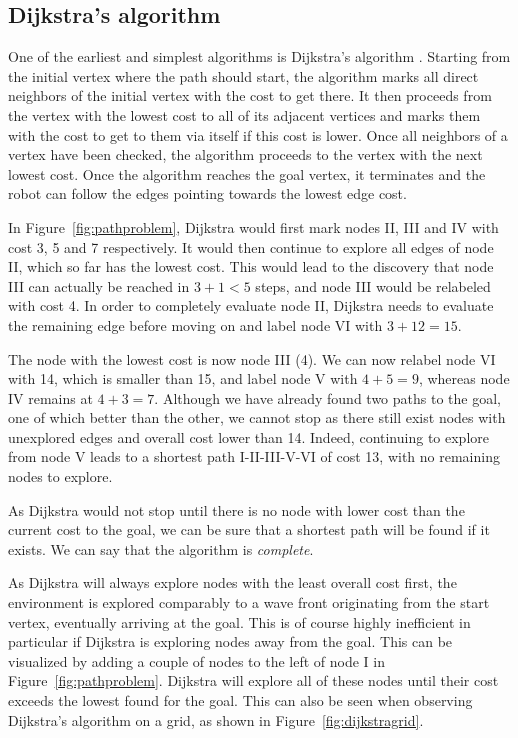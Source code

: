 \subsection{Dijkstra's algorithm}
One of the earliest and simplest algorithms is Dijkstra's algorithm \cite{dijkstra1959note}. Starting from the initial vertex where the path should start, the algorithm marks all direct neighbors of the initial vertex with the cost to get there. It then proceeds from the vertex with the lowest cost to all of its adjacent vertices and marks them with the cost to get to them via itself if this cost is lower. Once all neighbors of a vertex have been checked, the algorithm proceeds to the vertex with the next lowest cost. Once the algorithm reaches the goal vertex, it terminates and the robot can follow the edges pointing towards the lowest edge cost.

In Figure~\ref{fig:pathproblem}, Dijkstra would first mark nodes II, III and IV with cost 3, 5 and 7 respectively. It would then continue to explore all edges of node II, which so far has the lowest cost. This would lead to the discovery that node III can actually be reached in $3+1<5$ steps, and node III would be relabeled with cost 4. In order to completely evaluate node II, Dijkstra needs to evaluate the remaining edge before moving on and label node VI with $3+12=15$.

The node with the lowest cost is now node III (4). We can now relabel node VI with 14, which is smaller than 15, and label node V with $4+5=9$, whereas node IV remains at $4+3=7$. Although we have already found two paths to the goal, one of which better than the other, we cannot stop as there still exist nodes with unexplored edges and overall cost lower than 14. Indeed, continuing to explore from node V leads to a shortest path I-II-III-V-VI of cost 13, with no remaining nodes to explore.

As Dijkstra would not stop until there is no node with lower cost than the current cost to the goal, we can be sure that a shortest path will be found if it exists. We can say that the algorithm is \emph{complete}.

As Dijkstra will always explore nodes with the least overall cost first, the environment is explored comparably to a wave front originating from the start vertex, eventually arriving at the goal. This is of course highly inefficient in particular if Dijkstra is exploring nodes away from the goal. This can be visualized by adding a couple of nodes to the left of node I in Figure~\ref{fig:pathproblem}. Dijkstra will explore all of these nodes until their cost exceeds the lowest found for the goal. This can also be seen when observing Dijkstra's algorithm on a grid, as shown in Figure~\ref{fig:dijkstragrid}.

